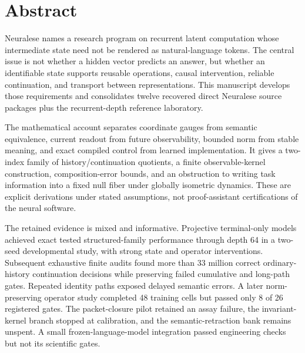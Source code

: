 \documentclass[11pt]{article}
\begin{document}
\section*{Abstract}
Neuralese names a research program on recurrent latent computation whose intermediate state need not be rendered as natural-language tokens. The central issue is not whether a hidden vector predicts an answer, but whether an identifiable state supports reusable operations, causal intervention, reliable continuation, and transport between representations. This manuscript develops those requirements and consolidates twelve recovered direct Neuralese source packages plus the recurrent-depth reference laboratory.

The mathematical account separates coordinate gauges from semantic equivalence, current readout from future observability, bounded norm from stable meaning, and exact compiled control from learned implementation. It gives a two-index family of history/continuation quotients, a finite observable-kernel construction, composition-error bounds, and an obstruction to writing task information into a fixed null fiber under globally isometric dynamics. These are explicit derivations under stated assumptions, not proof-assistant certifications of the neural software.

The retained evidence is mixed and informative. Projective terminal-only models achieved exact tested structured-family performance through depth 64 in a two-seed developmental study, with strong state and operator interventions. Subsequent exhaustive finite audits found more than 33 million correct ordinary-history continuation decisions while preserving failed cumulative and long-path gates. Repeated identity paths exposed delayed semantic errors. A later norm-preserving operator study completed 48 training cells but passed only 8 of 26 registered gates. The packet-closure pilot retained an assay failure, the invariant-kernel branch stopped at calibration, and the semantic-retraction bank remains unspent. A small frozen-language-model integration passed engineering checks but not its scientific gates.
\end{document}
